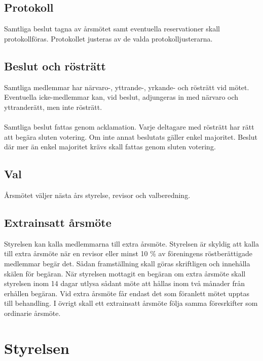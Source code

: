 \documentclass[a4paper,11pt]{article}
\begin{document}
\subsection{Protokoll}
Samtliga beslut tagna av årsmötet samt eventuella reservationer skall protokollföras. Protokollet justeras av de valda protokolljusterarna.

\subsection{Beslut och rösträtt}
Samtliga medlemmar har närvaro-, yttrande-, yrkande- och rösträtt vid mötet. Eventuella icke-medlemmar kan, vid beslut, adjungeras in med närvaro och yttranderätt, men inte rösträtt.
\paragraph{}
Samtliga beslut fattas genom acklamation. Varje deltagare med rösträtt har rätt att begära sluten votering. Om inte annat beslutats gäller enkel majoritet. Beslut där mer än enkel majoritet krävs skall fattas genom sluten votering.

\subsection{Val}
Årsmötet väljer nästa års styrelse, revisor och valberedning.

\subsection{Extrainsatt årsmöte}
Styrelsen kan kalla medlemmarna till extra årsmöte. Styrelsen är skyldig att kalla till extra årsmöte när en revisor eller minst 10 \% av föreningens röstberättigade medlemmar begär det. Sådan framställning skall göras skriftligen och innehålla skälen för begäran. När styrelsen mottagit en begäran om extra årsmöte skall styrelsen inom 14 dagar utlysa sådant möte att hållas inom två månader från erhållen begäran. Vid extra årsmöte får endast det som föranlett mötet upptas till behandling. I övrigt skall ett extrainsatt årsmöte följa samma föresrkifter som ordinarie årsmöte.


\section{Styrelsen}
\end{document}

